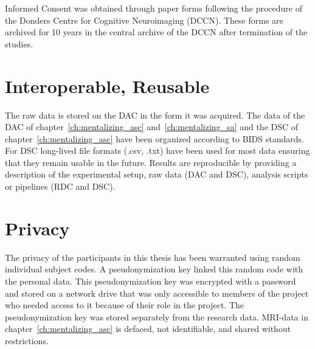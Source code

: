 Informed Consent was obtained through paper forms following the procedure of the Donders Centre for Cognitive Neuroimaging (DCCN). These forms are archived for 10 years in the central archive of the DCCN after termination of the studies. 
    
\section*{Interoperable, Reusable}
The raw data is stored on the DAC in the form it was acquired. The data of the DAC of chapter~\ref{ch:mentalizing_asc} and~\ref{ch:mentalizing_sa} and the DSC of chapter~\ref{ch:mentalizing_asc} have been organized according to BIDS standards. For DSC long-lived file formats (.csv, .txt) have been used for most data ensuring that they remain usable in the future. Results are reproducible by providing a description of the experimental setup, raw data (DAC and DSC), analysis scripts or pipelines (RDC and DSC).

\section*{Privacy}
The privacy of the participants in this thesis has been warranted using random individual subject codes. A pseudonymization key linked this random code with the personal data. This pseudonymization key was encrypted with a password and stored on a network drive that was only accessible to members of the project who needed access to it because of their role in the project. The pseudonymization key was stored separately from the research data. MRI-data in chapter~\ref{ch:mentalizing_asc} is defaced, not identifiable, and shared without restrictions.

